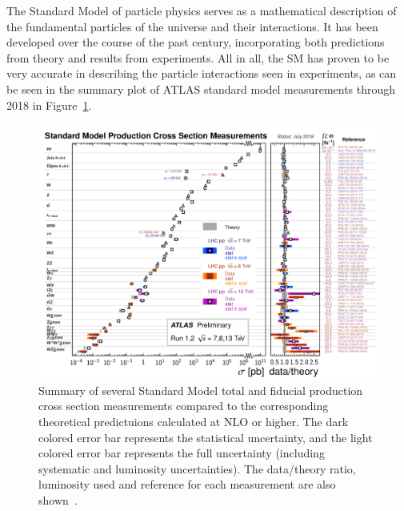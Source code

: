 ﻿The Standard Model of particle physics serves as a mathematical description of the fundamental particles of the universe and their interactions.
It has been developed over the course of the past century, incorporating both predictions from theory and results from experiments.
All in all, the SM has proven to be very accurate in describing the particle interactions seen in experiments, as can be seen in the summary plot of ATLAS standard model measurements through 2018 in Figure~\ref{fig:theory_sm_meas}.

\begin{figure}
  \centering
  \includegraphics[width=.95\textwidth]{figs/theory/ATLAS_sm_measurements}
  \caption[Summary of several Standard Model total and fiducial production cross section measurements compared to the corresponding theoretical predictuions calculated at NLO or higher. The dark colored error bar represents the statistical uncertainty, and the light colored error bar represents the full uncertainty (including systematic and luminosity uncertainties). The data/theory ratio, luminosity used and reference for each measurement are also shown.]{Summary of several Standard Model total and fiducial production cross section measurements compared to the corresponding theoretical predictuions calculated at NLO or higher. The dark colored error bar represents the statistical uncertainty, and the light colored error bar represents the full uncertainty (including systematic and luminosity uncertainties). The data/theory ratio, luminosity used and reference for each measurement are also shown~\cite{2019.atlas-summary-plots}.}
  \label{fig:theory_sm_meas}
\end{figure}

